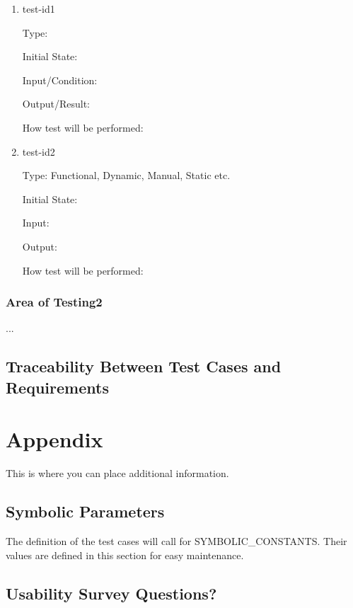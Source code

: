 \documentclass[12pt, titlepage]{article}
\begin{document}
\begin{enumerate}

\item{test-id1\\}

Type: 
					
Initial State: 
					
Input/Condition: 
					
Output/Result: 
					
How test will be performed: 
					
\item{test-id2\\}

Type: Functional, Dynamic, Manual, Static etc.
					
Initial State: 
					
Input: 
					
Output: 
					
How test will be performed: 

\end{enumerate}

\subsubsection{Area of Testing2}

...

\subsection{Traceability Between Test Cases and Requirements}

				




\newpage

\section{Appendix}

This is where you can place additional information.

\subsection{Symbolic Parameters}

The definition of the test cases will call for SYMBOLIC\_CONSTANTS.
Their values are defined in this section for easy maintenance.

\subsection{Usability Survey Questions?}

\end{document}
